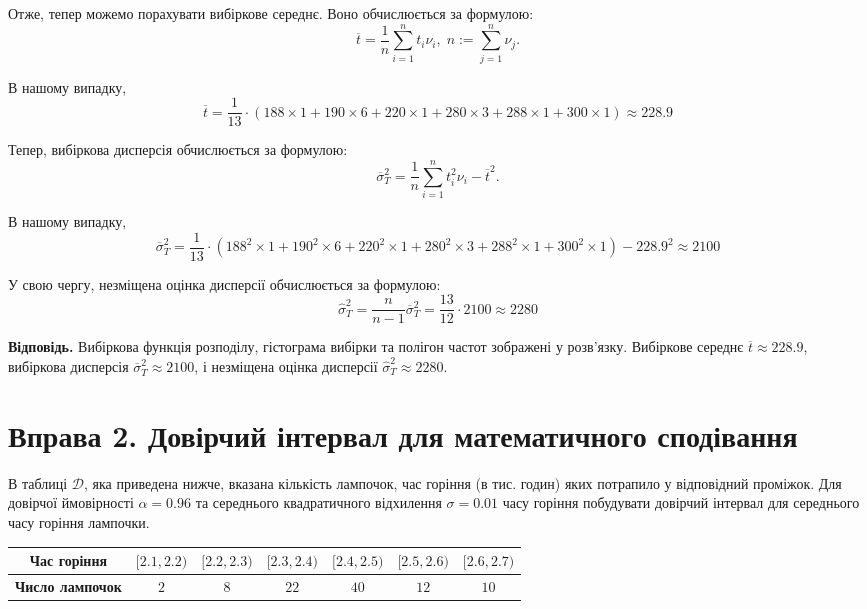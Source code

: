 \documentclass{../hw_template}
\begin{document}
Отже, тепер можемо порахувати вибіркове середнє. Воно обчислюється за формулою:
\begin{equation*}
    \overline{t} = \frac{1}{n}\sum_{i=1}^n t_i \nu_i, \; n := \sum_{j=1}^n \nu_j.
\end{equation*}

В нашому випадку, 
\begin{equation*}
    \overline{t} = \frac{1}{13} \cdot (188 \times 1 + 190 \times 6 + 220 \times 1 + 280 \times 3 + 288 \times 1 + 300 \times 1) \approx 228.9
\end{equation*}

Тепер, вибіркова дисперсія обчислюється за формулою:
\begin{equation*}
    \overline{\sigma}_T^2 = \frac{1}{n}\sum_{i=1}^n t_i^2\nu_i - \overline{t}^2.
\end{equation*}

В нашому випадку,
\begin{equation*}
    \overline{\sigma}_T^2 = \frac{1}{13} \cdot (188^2 \times 1 + 190^2 \times 6 + 220^2 \times 1 + 280^2 \times 3 + 288^2 \times 1 + 300^2 \times 1) - 228.9^2 \approx 2100
\end{equation*}

У свою чергу, незміщена оцінка дисперсії обчислюється за формулою:
\begin{equation*}
    \hat{\sigma}_T^2 = \frac{n}{n-1}\overline{\sigma}_T^2 = \frac{13}{12} \cdot 2100 \approx 2280
\end{equation*}

\textbf{Відповідь.} Вибіркова функція розподілу, гістограма вибірки та полігон
частот зображені у розв'язку. Вибіркове середнє $\overline{t} \approx 228.9$, вибіркова дисперсія $\overline{\sigma}_T^2 \approx 2100$, і незміщена оцінка дисперсії $\hat{\sigma}_T^2 \approx 2280$.

\pagebreak

\section{Вправа 2. Довірчий інтервал для математичного сподівання}

\begin{problems}
    В таблиці $\mathcal{D}$, яка приведена нижче, вказана кількість лампочок, час горіння
(в тис. годин) яких потрапило у відповідний проміжок. Для довірчої
ймовірності $\alpha=0.96$ та середнього квадратичного відхилення $\sigma = 0.01$ часу
горіння побудувати довірчий інтервал для середнього часу горіння лампочки.

\vspace{5px}
\begin{center}
    \begin{tabular}{|c|c|c|c|c|c|c|}
        \hline
        \textbf{Час горіння} & $[2.1,2.2)$ & $[2.2,2.3)$ & $[2.3,2.4)$ & $[2.4,2.5)$ & $[2.5,2.6)$ & $[2.6,2.7)$ \\
        \hline
        \textbf{Число лампочок} & $2$ & $8$ & $22$ & $40$ & $12$ & $10$ \\
        \hline
    \end{tabular}
\end{center}


\end{problems}
\end{document}
